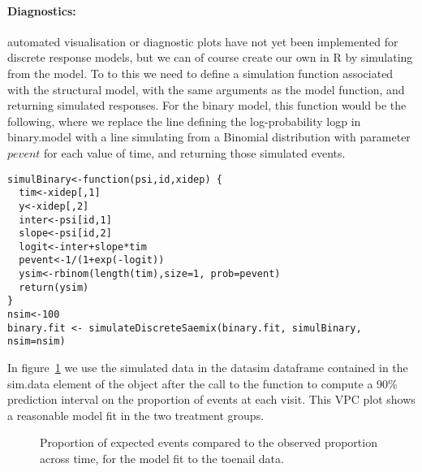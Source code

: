 \paragraph{Diagnostics:} automated visualisation or diagnostic plots have not yet been implemented for discrete response models, but we can of course create our own in R by simulating from the model. To to this we need to define a simulation function associated with the structural model, with the same arguments as the model function, and returning simulated responses. For the binary model, this function would be the following, where we replace the line defining the log-probability {\sf logp} in {\sf binary.model} with a line simulating from a Binomial distribution with parameter $pevent$ for each value of time, and returning those simulated events.

\begin{verbatim}
simulBinary<-function(psi,id,xidep) {
  tim<-xidep[,1]
  y<-xidep[,2]
  inter<-psi[id,1]
  slope<-psi[id,2]
  logit<-inter+slope*tim
  pevent<-1/(1+exp(-logit))
  ysim<-rbinom(length(tim),size=1, prob=pevent)
  return(ysim)
}
nsim<-100
binary.fit <- simulateDiscreteSaemix(binary.fit, simulBinary, nsim=nsim)
\end{verbatim}

In figure~\ref{fig:toenailPropVPC} we use the simulated data in the {\sf datasim} dataframe contained in the {\sf sim.data} element of the object after the call to the function to compute a 90\% prediction interval on the proportion of events at each visit. This VPC plot shows a reasonable model fit in the two treatment groups.

\begin{figure}[!h]
\begin{center}
\end{center}
\par \kern -0.5cm
\caption{Proportion of expected events compared to the observed proportion across time, for the model fit to the toenail data.} \label{fig:toenailPropVPC}
\end{figure}

